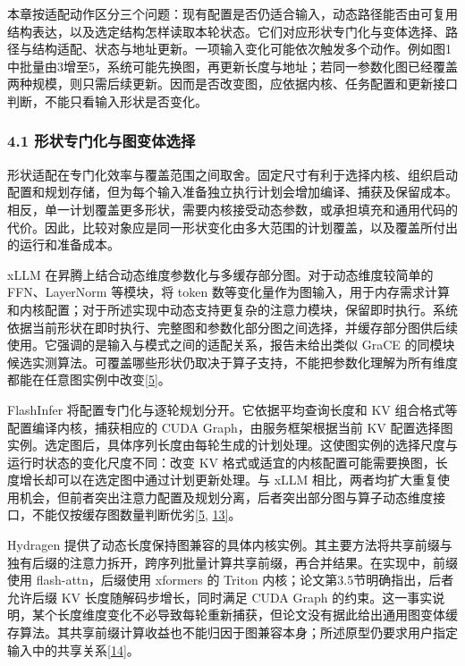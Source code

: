 \documentclass[UTF8,11pt,fontset=windows]{ctexart}
\begin{document}
本章按适配动作区分三个问题：现有配置是否仍适合输入，动态路径能否由可复用结构表达，以及选定结构怎样读取本轮状态。它们对应形状专门化与变体选择、路径与结构适配、状态与地址更新。一项输入变化可能依次触发多个动作。例如图1中批量由3增至5，系统可能先换图，再更新长度与地址；若同一参数化图已经覆盖两种规模，则只需后续更新。因而是否改变图，应依据内核、任务配置和更新接口判断，不能只看输入形状是否变化。

\hypertarget{section-4-1}{%
\subsubsection{4.1 形状专门化与图变体选择}\label{section-4-1}}

形状适配在专门化效率与覆盖范围之间取舍。固定尺寸有利于选择内核、组织启动配置和规划存储，但为每个输入准备独立执行计划会增加编译、捕获及保留成本。相反，单一计划覆盖更多形状，需要内核接受动态参数，或承担填充和通用代码的代价。因此，比较对象应是同一形状变化由多大范围的计划覆盖，以及覆盖所付出的运行和准备成本。

xLLM 在昇腾上结合动态维度参数化与多缓存部分图。对于动态维度较简单的 FFN、LayerNorm 等模块，将 token 数等变化量作为图输入，用于内存需求计算和内核配置；对于所述实现中动态支持更复杂的注意力模块，保留即时执行。系统依据当前形状在即时执行、完整图和参数化部分图之间选择，并缓存部分图供后续使用。它强调的是输入与模式之间的适配关系，报告未给出类似 GraCE 的同模块候选实测算法。可覆盖哪些形状仍取决于算子支持，不能把参数化理解为所有维度都能在任意图实例中改变\protect\hyperlink{ref-5}{{[}5{]}}。

FlashInfer 将配置专门化与逐轮规划分开。它依据平均查询长度和 KV 组合格式等配置编译内核，捕获相应的 CUDA Graph，由服务框架根据当前 KV 配置选择图实例。选定图后，具体序列长度由每轮生成的计划处理。这使图实例的选择尺度与运行时状态的变化尺度不同：改变 KV 格式或适宜的内核配置可能需要换图，长度增长却可以在选定图中通过计划更新处理。与 xLLM 相比，两者均扩大重复使用机会，但前者突出注意力配置及规划分离，后者突出部分图与算子动态维度接口，不能仅按缓存图数量判断优劣\protect\hyperlink{ref-5}{{[}5}, \protect\hyperlink{ref-13}{13{]}}。

Hydragen 提供了动态长度保持图兼容的具体内核实例。其主要方法将共享前缀与独有后缀的注意力拆开，跨序列批量计算共享前缀，再合并结果。在实现中，前缀使用 flash-attn，后缀使用 xformers 的 Triton 内核；论文第3.5节明确指出，后者允许后缀 KV 长度随解码步增长，同时满足 CUDA Graph 的约束。这一事实说明，某个长度维度变化不必导致每轮重新捕获，但论文没有据此给出通用图变体缓存算法。其共享前缀计算收益也不能归因于图兼容本身；所述原型仍要求用户指定输入中的共享关系\protect\hyperlink{ref-14}{{[}14{]}}。
\end{document}
